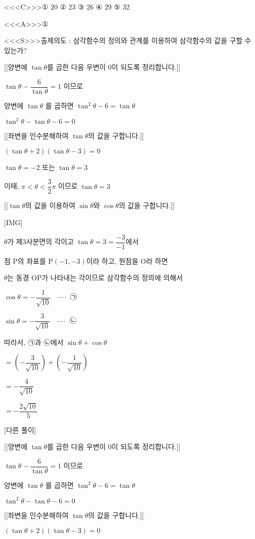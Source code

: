 \documentclass{oblivoir}
\begin{document}
<<<C>>>① $20$
② $23$
③ $26$
④ $29$
⑤ $32$

<<<A>>>①

<<<S>>>출제의도 : 삼각함수의 정의와 관계를 이용하여 삼각함수의 값을 구할 수 있는가?

[[양변에 $\tan \theta$를 곱한 다음 우변이 $0$이 되도록 정리합니다.]]

$\tan \theta-\dfrac{6}{\tan \theta}=1$ 이므로

양변에 $\tan \theta$ 를 곱하면
$\tan ^{2} \theta-6=\tan \theta$

$\tan ^{2} \theta-\tan \theta-6=0$

[[좌변을 인수분해하여 $\tan \theta$의 값을 구합니다.]]

$(\tan \theta+2)(\tan \theta-3)=0$

$\tan \theta=-2$ 또는 $\tan \theta=3$

이때, $\pi< \theta< \dfrac{3}{2} \pi$ 이므로
$\tan \theta=3$

[[$\tan \theta$의 값을 이용하여 $\sin \theta$와 $\cos \theta$의 값을 구합니다.]]

[IMG]

$\theta$가 제$3$사분면의 각이고 $\tan \theta=3 = \dfrac{-3}{-1}$에서

점 $\mathrm{P}$의 좌표를 $\mathrm{P}(-1,-3)$이라 하고, 원점을 $\mathrm{O}$라 하면

$\theta$는 동경 $\mathrm{OP}$가 나타내는 각이므로 삼각함수의 정의에 의해서 

$\cos \theta=-\dfrac{1}{\sqrt{10}} \quad \cdots \cdot$ ㉠

$\sin \theta=-\dfrac{3}{\sqrt{10}} \quad \cdots \cdot$ ㉡

따라서, ㉠과 ㉡에서 $\sin \theta+\cos \theta$

$=\left(-\dfrac{3}{\sqrt{10}}\right)+\left(-\dfrac{1}{\sqrt{10}}\right)$

$=-\dfrac{4}{\sqrt{10}}$

$=-\dfrac{2 \sqrt{10}}{5}$

[다른 풀이]

[[양변에 $\tan \theta$를 곱한 다음 우변이 $0$이 되도록 정리합니다.]]

$\tan \theta-\dfrac{6}{\tan \theta}=1$ 이므로

양변에 $\tan \theta$ 를 곱하면
$\tan ^{2} \theta-6=\tan \theta$

$\tan ^{2} \theta-\tan \theta-6=0$

[[좌변을 인수분해하여 $\tan \theta$의 값을 구합니다.]]

$(\tan \theta+2)(\tan \theta-3)=0$
\end{document}
